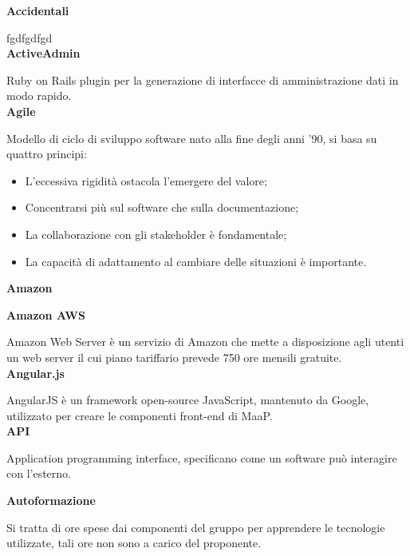 





\makeFrontPage



\clearpage
{}

\textbf{Accidentali}

fgdfgdfgd \\

\textbf{ActiveAdmin}

Ruby on Rails plugin per la generazione di interfacce di amministrazione dati in modo rapido. \\

\textbf{Agile}

Modello di ciclo di sviluppo software nato alla fine degli anni '90, si basa su quattro principi:
\begin{itemize}
\item L'eccessiva rigidità ostacola l'emergere del valore;
\item Concentrarsi più sul software che sulla documentazione;
\item La collaborazione con gli stakeholder è fondamentale;
\item La capacità di adattamento al cambiare delle situazioni è importante.
\end{itemize} 

\textbf{Amazon}

\textbf{Amazon AWS}

Amazon Web Server è un servizio di Amazon che mette a disposizione agli utenti un web server il cui piano tariffario prevede 750 ore mensili gratuite. \\

\textbf{Angular.js}

AngularJS è un framework open-source JavaScript, mantenuto da Google, utilizzato per creare le componenti front-end di MaaP. \\

\textbf{API}

Application programming interface, specificano come un software può interagire con l'esterno.

\textbf{Autoformazione}

Si tratta di ore spese dai componenti del gruppo per apprendere le tecnologie utilizzate, tali ore non sono a carico del proponente. \\


